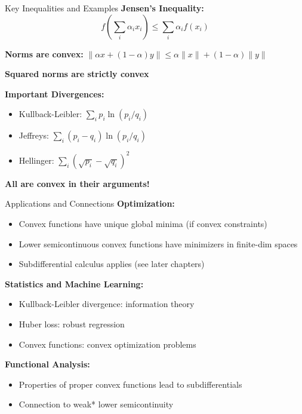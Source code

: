 \documentclass[aspectratio=169,10pt]{beamer}
\begin{document}
\begin{frame}{Key Inequalities and Examples}
    \textbf{Jensen's Inequality:}
    \[
    f\left(\sum_i \alpha_i x_i\right) \leq \sum_i \alpha_i f(x_i)
    \]

    \vspace{0.3cm}

    \textbf{Norms are convex:} $\|\alpha x + (1-\alpha)y\| \leq \alpha \|x\| + (1-\alpha)\|y\|$

    \vspace{0.3cm}

    \textbf{Squared norms are strictly convex}

    \vspace{0.3cm}

    \textbf{Important Divergences:}
    \begin{itemize}
        \item Kullback-Leibler: $\sum_i p_i \ln(p_i/q_i)$
        \item Jeffreys: $\sum_i (p_i - q_i) \ln(p_i/q_i)$
        \item Hellinger: $\sum_i (\sqrt{p_i} - \sqrt{q_i})^2$
    \end{itemize}

    \vspace{0.2cm}

    \textbf{All are convex in their arguments!}
\end{frame}

\begin{frame}{Applications and Connections}
    \textbf{Optimization:}
    \begin{itemize}
        \item Convex functions have unique global minima (if convex constraints)
        \item Lower semicontinuous convex functions have minimizers in finite-dim spaces
        \item Subdifferential calculus applies (see later chapters)
    \end{itemize}

    \vspace{0.3cm}

    \textbf{Statistics and Machine Learning:}
    \begin{itemize}
        \item Kullback-Leibler divergence: information theory
        \item Huber loss: robust regression
        \item Convex functions: convex optimization problems
    \end{itemize}

    \vspace{0.3cm}

    \textbf{Functional Analysis:}
    \begin{itemize}
        \item Properties of proper convex functions lead to subdifferentials
        \item Connection to weak* lower semicontinuity
    \end{itemize}
\end{frame}
\end{document}
